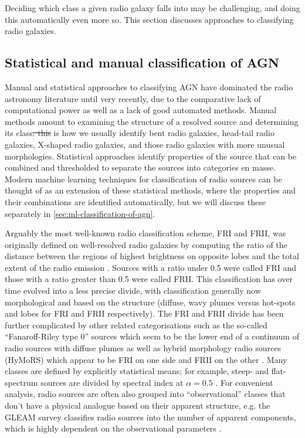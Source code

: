 \documentclass[11pt, a4paper]{book}
\providecommand{\DIFaddtex}[1]{{\protect\color{blue}\uwave{#1}}} %
\providecommand{\DIFdeltex}[1]{{\protect\color{red}\sout{#1}}}                      %
\providecommand{\DIFaddbegin}{} %
\providecommand{\DIFaddend}{} %
\providecommand{\DIFdelbegin}{} %
\providecommand{\DIFdelend}{} %
\providecommand{\DIFadd}[1]{\texorpdfstring{\DIFaddtex{#1}}{#1}} %
\providecommand{\DIFdel}[1]{\texorpdfstring{\DIFdeltex{#1}}{}} %
\newcommand{\DIFscaledelfig}{0.5}
\newlength{\DIFdelgraphicswidth} %
\newlength{\DIFdelgraphicsheight} %
\newcommand{\DIFaddincludegraphics}[2][]{{\color{blue}\fbox{\DIFOincludegraphics[#1]{#2}}}} %
\newcommand{\DIFdelincludegraphics}[2][]{%
\sbox{\DIFdelgraphicsbox}{\DIFOincludegraphics[#1]{#2}}%
\settoboxwidth{\DIFdelgraphicswidth}{\DIFdelgraphicsbox} %
\settoboxtotalheight{\DIFdelgraphicsheight}{\DIFdelgraphicsbox} %
\scalebox{\DIFscaledelfig}{%
\parbox[b]{\DIFdelgraphicswidth}{\usebox{\DIFdelgraphicsbox}\\[-\baselineskip] \rule{\DIFdelgraphicswidth}{0em}}\llap{\resizebox{\DIFdelgraphicswidth}{\DIFdelgraphicsheight}{%
\setlength{\unitlength}{\DIFdelgraphicswidth}%
\begin{picture}(1,1)%
\thicklines\linethickness{2pt} %
{\color[rgb]{1,0,0}\put(0,0){\framebox(1,1){}}}%
{\color[rgb]{1,0,0}\put(0,0){\line( 1,1){1}}}%
{\color[rgb]{1,0,0}\put(0,1){\line(1,-1){1}}}%
\end{picture}%
}\hspace*{3pt}}} %
} %
\DeclareRobustCommand{\DIFaddbegin}{\DIFOaddbegin \let\includegraphics\DIFaddincludegraphics} %
\DeclareRobustCommand{\DIFaddend}{\DIFOaddend \let\includegraphics\DIFOincludegraphics} %
\DeclareRobustCommand{\DIFdelbegin}{\DIFOdelbegin \let\includegraphics\DIFdelincludegraphics} %
\DeclareRobustCommand{\DIFdelend}{\DIFOaddend \let\includegraphics\DIFOincludegraphics} %
\begin{document}
    Deciding which class a given radio galaxy falls into may be challenging, and doing this automatically even more so. This section discusses approaches to classifying radio galaxies.

    \subsection{Statistical and manual classification of AGN}
    \label{sec:manual-classification}

        Manual and statistical approaches to classifying AGN have dominated the radio astronomy literature until very recently, due to the comparative lack of computational power as well as a lack of good automated methods. Manual methods amount to examining the structure of a resolved source and determining its class\DIFdelbegin \DIFdel{: this }\DIFdelend \DIFaddbegin \DIFadd{. This }\DIFaddend is how we usually identify bent radio galaxies, head-tail radio galaxies, X-shaped radio galaxies, and those radio galaxies with more unusual morphologies. Statistical approaches identify properties of the source that can be combined and thresholded to separate the sources into categories en masse. Modern machine learning techniques for classification of radio sources can be thought of as an extension of these statistical methods, where the properties and their combinations are identified automatically, but we will discuss these separately in \autoref{sec:ml-classification-of-agn}.

        Arguably the most well-known radio classification scheme, FRI and FRII, was originally defined on well-resolved radio galaxies by computing the ratio of the distance between the regions of highest brightness on opposite lobes and the total extent of the radio emission \citep{fanaroff1974}. Sources with a ratio under 0.5 were called FRI and those with a ratio greater than 0.5 were called FRII. This classification has over time evolved into a less precise divide, with classification generally now morphological and based on the structure (diffuse, wavy plumes versus hot-spots and lobes for FRI and FRII respectively). The FRI and FRII divide has been further complicated by other related categorisations such as the so-called ``Fanaroff-Riley type 0'' sources which seem to be the lower end of a continuum of radio sources with diffuse plumes \citep{garofalo_fr0_2019,capetti_lofar_2020} as well as hybrid morphology radio sources (HyMoRS) which appear to be FRI on one side and FRII on the other \citep{gopal-krishna_extragalactic_2000,kapinska_radio_2017}. Many classes are defined by explicitly statistical means; for example, steep- and flat-spectrum sources are divided by spectral index at $\alpha = 0.5$ \citep{urry95unified}. For convenient analysis, radio sources are often also grouped into ``observational'' classes that don't have a physical analogue based on their apparent structure, e.g. the GLEAM survey classifies radio sources into the number of apparent components, which is highly dependent on the observational parameters \citep{white_gleam_2020}.
\end{document}

